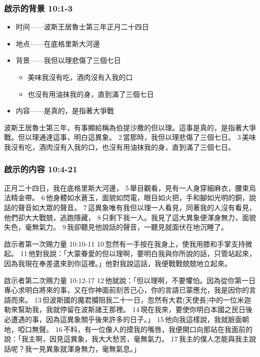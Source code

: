 \iffalse
\subsubsection{啟示的背景 10:1-3}
\begin{itemize}
\itemsep-.45em  
\item 时间——波斯王居魯士第三年正月二十四日
\item 地点——在底格里斯大河邊
\item 背景——我但以理悲傷了三個七日
\begin{itemize}
\itemsep-.45em  
\item 美味我沒有吃，酒肉沒有入我的口
\item 也沒有用油抹我的身，直到滿了三個七日
\end{itemize}
\item 内容——是真的，是指著大爭戰
\end{itemize}
波斯王居魯士第三年，有事顯給稱為伯提沙撒的但以理。這事是真的，是指著大爭戰。但以理通達這事，明白這異象。 2 當那時，我但以理悲傷了三個七日。 3 美味我沒有吃，酒肉沒有入我的口，也沒有用油抹我的身，直到滿了三個七日。

\subsubsection{啟示的内容 10:4-21}
正月二十四日，我在底格里斯大河邊， 5 舉目觀看，見有一人身穿細麻衣，腰束烏法精金帶。 6 他身體如水蒼玉，面貌如閃電，眼目如火把，手和腳如光明的銅，說話的聲音如大眾的聲音。 7 這異象唯有我但以理一人看見，同著我的人沒有看見，他們卻大大戰兢，逃跑隱藏， 8 只剩下我一人。我見了這大異象便渾身無力，面貌失色，毫無氣力。 9 我卻聽見他說話的聲音，一聽見就面伏在地沉睡了。

啟示者第一次赐力量 10:10-11 
10 忽然有一手按在我身上，使我用膝和手掌支持微起。 11 他對我說：「大蒙眷愛的但以理啊，要明白我與你所說的話，只管站起來，因為我現在奉差遣來到你這裡。」他對我說這話，我便戰戰兢兢地立起來。 

啟示者第二次赐力量 10:12-17 
12 他就說：「但以理啊，不要懼怕。因為從你第一日專心求明白將來的事，又在你神面前刻苦己心，你的言語已蒙應允，我是因你的言語而來。 13 但波斯國的魔君攔阻我二十一日，忽然有大君(天使長)中的一位米迦勒來幫助我，我就停留在波斯諸王那裡。 14 現在我來，要使你明白本國之民日後必遭遇的事，因為這異象關乎後來許多的日子。」 15 他向我這樣說，我就臉面朝地，啞口無聲。 16 不料，有一位像人的摸我的嘴唇，我便開口向那站在我面前的說：「我主啊，因見這異象，我大大愁苦，毫無氣力。 17 我主的僕人怎能與我主說話呢？我一見異象就渾身無力，毫無氣息。」

